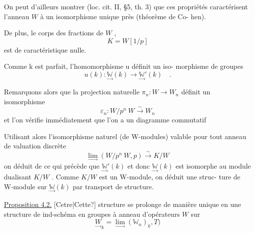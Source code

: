\documentclass[11pt]{article}
\newcommand{\scanpage}[1]{\par\bigskip\noindent{\small\sffamily[scan #1]}\par}
\newcommand{\mspage}[1]{{\small\sffamily[p.\,#1]}}
\newcommand{\hand}[1]{\textcolor{blue}{#1}}
\newcommand{\uline}[1]{\underline{#1}}
\newcommand{\unsure}[1]{[#1?]}
\newenvironment{diagramblock}{\par\begin{center}}{\end{center}\par}
\begin{document}
On peut d'ailleurs montrer (loc. cit. II, §5, th. 3) que ces propriétés
caractérisent l'anneau $W$ à un isomorphisme unique près (théorème de Co-%
hen).

De plus, le corps des fractions de $W$ ,
\[ K = W[1/p] \]
est de caractéristique nulle.

\mspage{\hand{21}}

\clearpage
\scanpage{129/22}
Comme k est parfait, l'homomorphisme u définit un iso-%
morphisme de groupes
\[ u(k) : \underset{\rightarrow}{\mathbb{W}}(k) \rightarrow \underset{\rightarrow}{\mathbb{W}}'(k) \quad . \]

Remarquons alors que la projection naturelle $\pi_n : W \rightarrow W_n$
définit un isomorphisme
\[ \varepsilon_n : W/p^n\ W \overset{\sim}{\rightarrow} W_n \]
et l'on vérifie immédiatement que l'on a un diagramme commutatif
\begin{diagramblock}
\end{diagramblock}

Utilisant alors l'isomorphisme naturel (de W-modules) valable pour tout
anneau de valuation discrète
\[ \underset{\rightarrow}{\lim}(W/p^n\ W,p) \overset{\sim}{\rightarrow} K/W \]
on déduit de ce qui précède que $\underset{\rightarrow}{\mathbb{W}}'(k)$ et donc $\underset{\rightarrow}{\mathbb{W}}(k)$ est isomorphe au
module dualisant $K/W$ . Comme $K/W$ est un W-module, on déduit une struc-%
ture de W-module sur $\underset{\rightarrow}{\mathbb{W}}(k)$ par transport de structure.

\uline{Proposition 4.2.} \unsure{Cetre|Cette} structure se prolonge de manière unique en une
structure de ind-schéma en groupes à anneau d'opérateurs $W$ sur
\[ \underset{\rightarrow}{W}_k = \underset{\rightarrow}{\lim}(\mathbb{W}_n)_k, T) \]
\end{document}
